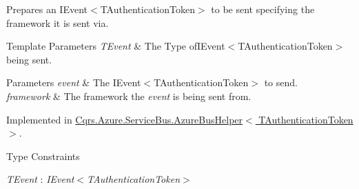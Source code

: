 Prepares an I\+Event$<$\+T\+Authentication\+Token$>$ to be sent specifying the framework it is sent via. 


\begin{DoxyTemplParams}{Template Parameters}
{\em T\+Event} & The Type ofI\+Event$<$\+T\+Authentication\+Token$>$ being sent.\\
\hline
\end{DoxyTemplParams}

\begin{DoxyParams}{Parameters}
{\em event} & The I\+Event$<$\+T\+Authentication\+Token$>$ to send.\\
\hline
{\em framework} & The framework the {\itshape event}  is being sent from.\\
\hline
\end{DoxyParams}


Implemented in \hyperlink{classCqrs_1_1Azure_1_1ServiceBus_1_1AzureBusHelper_afb3ade39a8f8fd39c871c687701d80f4_afb3ade39a8f8fd39c871c687701d80f4}{Cqrs.\+Azure.\+Service\+Bus.\+Azure\+Bus\+Helper$<$ T\+Authentication\+Token $>$}.

\begin{Desc}
\item[Type Constraints]\begin{description}
\item[{\em T\+Event} : {\em I\+Event$<$T\+Authentication\+Token$>$}]\end{description}
\end{Desc}
\mbox{\label{interfaceCqrs_1_1Azure_1_1ServiceBus_1_1IAzureBusHelper_ac68564203a196da2eb860e9cc11f8f4d_ac68564203a196da2eb860e9cc11f8f4d}} 
